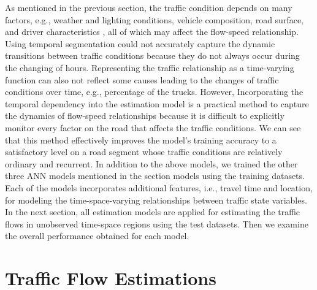 \documentclass[english]{kththesis}
\begin{document}
As mentioned in the previous section, the traffic condition depends on many factors, e.g., weather and lighting conditions, vehicle composition, road surface, and driver characteristics \cite{seo_tse, wang_tse_online_calibration}, all of which may affect the flow-speed relationship. Using temporal segmentation could not accurately capture the dynamic transitions between traffic conditions because they do not always occur during the changing of hours. Representing the traffic relationship as a time-varying function can also not reflect some causes leading to the changes of traffic conditions over time, e.g., percentage of the trucks. However, Incorporating the temporal dependency into the estimation model is a practical method to capture the dynamics of flow-speed relationships because it is difficult to explicitly monitor every factor on the road that affects the traffic conditions. We can see that this method effectively improves the model's training accuracy to a satisfactory level on a road segment whose traffic conditions are relatively ordinary and recurrent. In addition to the above models, we trained the other three ANN models mentioned in the section models using the training datasets. Each of the models incorporates additional features, i.e., travel time and location, for modeling the time-space-varying relationships between traffic state variables. In the next section, all estimation models are applied for estimating the traffic flows in unobserved time-space regions using the test datasets. Then we examine the overall performance obtained for each model.

\section{Traffic Flow Estimations}
\label{sec:trafficFlowEstimations}

\clearpage
\end{document}

